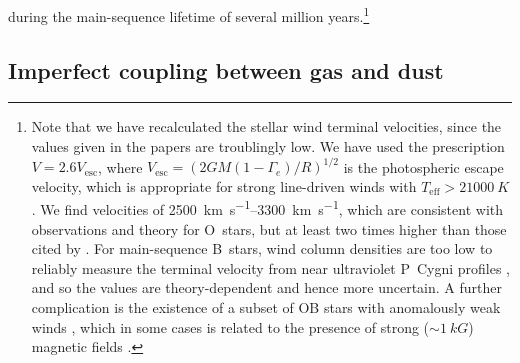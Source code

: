 during the main-sequence lifetime of several million years.\footnote{%
  \label{fn:meyer-velocities-too-low}
  Note that we have recalculated the stellar wind terminal velocities,
  since the values given in the \citeauthor{Meyer:2014b} papers are
  troublingly low.  We have used the prescription
  \(V = 2.6 V_{\text{esc}}\), where
  \(V_{\text{esc}} = \left( 2 G M (1 - \Gamma_e)/ R \right)^{1/2}\) is the
  photospheric escape velocity, which is appropriate for strong
  line-driven winds with \(T_{\text{eff}} > \SI{21 000}{K}\)
  \citep{Lamers:1995a}.  We find velocities of
  \SIrange{2500}{3300}{km.s^{-1}}, which are consistent with
  observations and theory \citep{Vink:1999a} for O~stars, but at least
  two times higher than those cited by \citet{Meyer:2014b}. For
  main-sequence B~stars, wind column densities are too low to reliably
  measure the terminal velocity from near ultraviolet P~Cygni profiles
  \citep{Prinja:1989a}, and so the values are theory-dependent
  \citep{Krticka:2014a} and hence more uncertain.  A further
  complication is the existence of a subset of OB stars with
  anomalously weak winds \citep{Puls:2008a}, which in some cases is
  related to the presence of strong (\(\sim \SI{1}{kG}\)) magnetic fields
  \citep{Oskinova:2011b}.} %



\subsection{Imperfect coupling between gas and dust}
\label{sec:imperf-coupl-betw}


